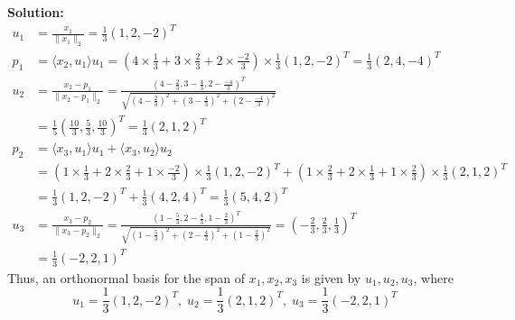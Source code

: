 \documentclass{article}
\begin{document}
\vspace{0.5cm}
\noindent\textbf{Solution:}
\begin{align*}
    u_1 &= \frac{x_1}{\|x_1\|_2} = \frac{1}{3} (1, 2, -2)^T \\
    p_1 &= \langle x_2, u_1 \rangle u_1 = (4 \times \frac{1}{3} + 3 \times \frac{2}{3} + 2 \times \frac{-2}{3}) \times \frac{1}{3} (1, 2, -2)^T = \frac{1}{3} (2, 4, -4)^T \\
    u_2 &= \frac{x_2 - p_1}{\|x_2 - p_1\|_2} = \frac{(4 - \frac{2}{3}, 3 - \frac{4}{3}, 2 - \frac{-4}{3})^T}{\sqrt{(4 - \frac{2}{3})^2 + (3 - \frac{4}{3})^2 + (2 - \frac{-4}{3})^2}} \\
    &= \frac{1}{5} (\frac{10}{3}, \frac{5}{3}, \frac{10}{3})^T = \frac{1}{3} (2, 1, 2)^T \\
    p_2 &= \langle x_3, u_1 \rangle u_1 + \langle x_3, u_2 \rangle u_2 \\
    &= (1 \times \frac{1}{3} + 2 \times \frac{2}{3} + 1 \times \frac{-2}{3}) \times \frac{1}{3} (1, 2, -2)^T + (1 \times \frac{2}{3} + 2 \times \frac{1}{3} + 1 \times \frac{2}{3}) \times \frac{1}{3} (2, 1, 2)^T \\
    &= \frac{1}{3} (1, 2, -2)^T + \frac{1}{3} (4, 2, 4)^T = \frac{1}{3} (5, 4, 2)^T \\
    u_3 &= \frac{x_3 - p_2}{\|x_3 - p_2\|_2} = \frac{(1 - \frac{5}{3}, 2 - \frac{4}{3}, 1 - \frac{2}{3})^T}{\sqrt{(1 - \frac{5}{3})^2 + (2 - \frac{4}{3})^2 + (1 - \frac{2}{3})^2}}
    = \left(-\frac{2}{3}, \frac{2}{3}, \frac{1}{3}\right)^T \\
    &= \frac{1}{3} (-2, 2, 1)^T
\end{align*}
Thus, an orthonormal basis for the span of ${x_1, x_2, x_3}$ is given by ${u_1, u_2, u_3}$, where
$$ u_1 = \frac{1}{3} (1, 2, -2)^T, \; u_2 = \frac{1}{3} (2, 1, 2)^T, \; u_3 = \frac{1}{3} (-2, 2, 1)^T $$
\end{document}
